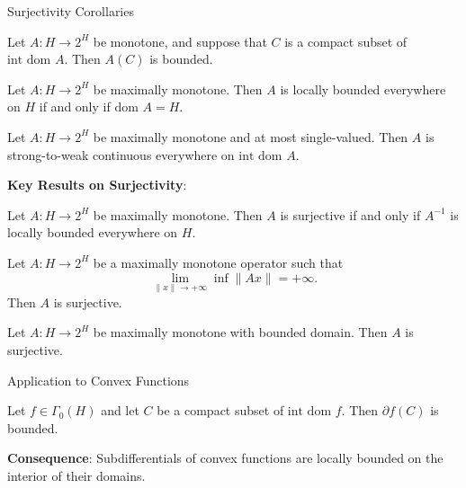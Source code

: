 \documentclass[aspectratio=169,10pt]{beamer}
\begin{document}
\begin{frame}[allowframebreaks]{Surjectivity Corollaries}
    \begin{corollary}[Corollary 21.19]
        Let $A: H \to 2^H$ be monotone, and suppose that $C$ is a compact subset of $\text{int dom } A$.
        Then $A(C)$ is bounded.
    \end{corollary}

    \begin{corollary}[Corollary 21.20]
        Let $A: H \to 2^H$ be maximally monotone. Then $A$ is locally bounded everywhere on $H$
        if and only if $\text{dom } A = H$.
    \end{corollary}

    \pagebreak

    \begin{corollary}[Corollary 21.21]
        Let $A: H \to 2^H$ be maximally monotone and at most single-valued. Then $A$ is
        strong-to-weak continuous everywhere on $\text{int dom } A$.
    \end{corollary}

    \vspace{1em}
    \textbf{Key Results on Surjectivity}:

    \begin{corollary}[Corollary 21.23]
        Let $A: H \to 2^H$ be maximally monotone. Then $A$ is surjective if and only if
        $A^{-1}$ is locally bounded everywhere on $H$.
    \end{corollary}

    \begin{corollary}[Corollary 21.24]
        Let $A: H \to 2^H$ be a maximally monotone operator such that
        \[
            \lim_{\|x\| \to +\infty} \inf \|Ax\| = +\infty.
        \]
        Then $A$ is surjective.
    \end{corollary}

    \begin{corollary}[Corollary 21.25]
        Let $A: H \to 2^H$ be maximally monotone with bounded domain. Then $A$ is surjective.
    \end{corollary}
\end{frame}

\begin{frame}{Application to Convex Functions}
    \begin{corollary}[Corollary 21.26]
        Let $f \in \Gamma_0(H)$ and let $C$ be a compact subset of $\text{int dom } f$.
        Then $\partial f(C)$ is bounded.
    \end{corollary}

    \textbf{Consequence}: Subdifferentials of convex functions are locally bounded on
    the interior of their domains.
\end{frame}
\end{document}
